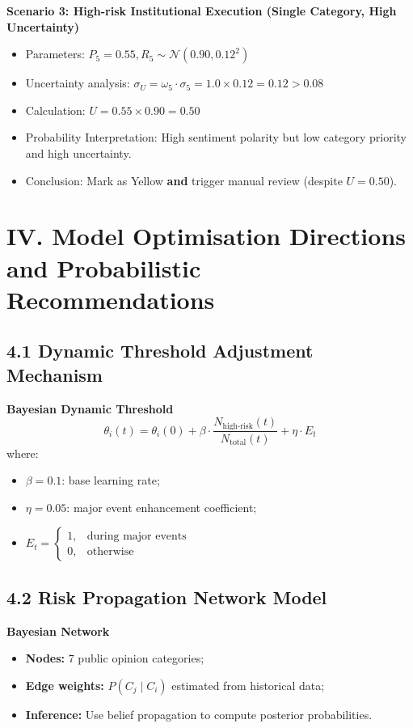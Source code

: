 \documentclass{article}
\numberwithin{equation}{section}
\begin{document}
\textbf{Scenario 3: High-risk Institutional Execution (Single Category, High Uncertainty)}
\begin{itemize}
    \item Parameters: $ P_5 = 0.55, R_5 \sim \mathcal{N}(0.90, 0.12^2) $
    \item Uncertainty analysis: $ \sigma_U = \omega_5 \cdot \sigma_5 = 1.0 \times 0.12 = 0.12 > 0.08 $
    \item Calculation: $ U = 0.55 \times 0.90 = 0.50 $
    \item Probability Interpretation: High sentiment polarity but low category priority and high uncertainty.
    \item Conclusion: Mark as Yellow \textbf{and} trigger manual review (despite $ U = 0.50 $).
\end{itemize}

\section*{IV. Model Optimisation Directions and Probabilistic Recommendations}

\subsection*{4.1 Dynamic Threshold Adjustment Mechanism}

\textbf{Bayesian Dynamic Threshold}
$$
\theta_i(t) = \theta_i(0) + \beta \cdot \dfrac{N_{\text{high-risk}}(t)}{N_{\text{total}}(t)} + \eta \cdot E_t
$$
where:
\begin{itemize}
    \item $ \beta = 0.1 $: base learning rate;
    \item $ \eta = 0.05 $: major event enhancement coefficient;
    \item $ E_t = \begin{cases} 1, & \text{during major events} \\ 0, & \text{otherwise} \end{cases} $
\end{itemize}

\subsection*{4.2 Risk Propagation Network Model}

\textbf{Bayesian Network}
\begin{itemize}
    \item \textbf{Nodes:} 7 public opinion categories;
    \item \textbf{Edge weights:} $ P(C_j \mid C_i) $ estimated from historical data;
    \item \textbf{Inference:} Use belief propagation to compute posterior probabilities.
\end{itemize}
\end{document}
